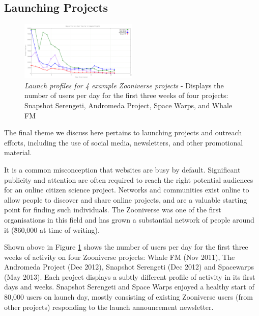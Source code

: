 \documentclass{sigchi}
\begin{document}


\subsection{Launching Projects}

\begin{figure}[tbp]
\centering
\includegraphics[width=0.50\textwidth]{data/launch-profiles/launch-profiles.png}
\caption{\emph{Launch profiles for 4 example Zooniverse projects} - Displays the number of users per day for the first three weeks of four projects: Snapshot Serengeti, Andromeda Project, Space Warps, and Whale FM}
\label{launchprofiles}
\end{figure}


The final theme we discuss here pertains to launching projects and outreach efforts, including the use of social media, newsletters, and other promotional material.

It is a common misconception that websites are busy by default. Significant publicity and attention are often required to reach the right potential audiences for an online citizen science project. Networks and communities exist online to allow people to discover and share online projects, and are a valuable starting point for finding such individuals. The Zooniverse was one of the first organisations in this field and has grown a substantial network of people around it (\~ 860,000 at time of writing).

Shown above in Figure \ref{launchprofiles} shows the number of users per day for the first three weeks of activity on four Zooniverse projects: Whale FM (Nov 2011), The Andromeda Project (Dec 2012), Snapshot Serengeti (Dec 2012) and Spacewarps (May 2013). Each project displays a subtly different profile of activity in its first days and weeks. Snapshot Serengeti and Space Warps enjoyed a healthy start of 80,000 users on launch day, mostly consisting of existing Zooniverse users (from other projects) responding to the launch announcement newsletter. %
\end{document}
